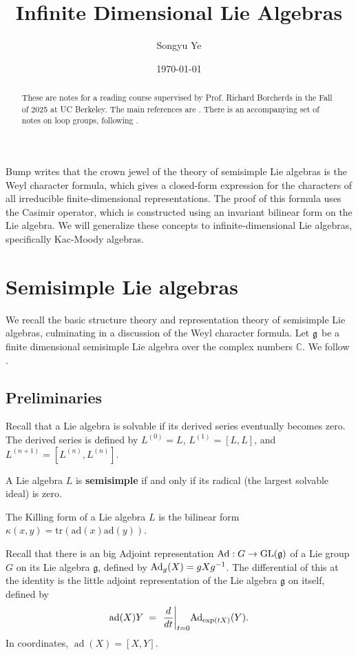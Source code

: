\documentclass[12pt]{article}
\begin{document}
\rhead{\today}
\cfoot{\thepage}

\title{Infinite Dimensional Lie Algebras}

\author{Songyu Ye}
\date{\today}
\maketitle


\begin{abstract}
    These are notes for a reading course supervised by Prof. Richard Borcherds in the Fall of 2025 at UC Berkeley. The main references are \cite{kac}. There is an accompanying set of notes on loop groups, following \cite{pressley-segal}.
\end{abstract}
\tableofcontents
Bump \cite{bump} writes that the crown jewel of the theory of semisimple Lie algebras is the Weyl character formula, which gives a closed-form expression for the characters of all irreducible finite-dimensional representations. The proof of this formula uses the Casimir operator, which is constructed using an invariant bilinear form on the Lie algebra. We will generalize these concepts to infinite-dimensional Lie algebras, specifically Kac-Moody algebras.
\section{Semisimple Lie algebras}
We recall the basic structure theory and representation theory of semisimple Lie algebras, culminating in a discussion of the Weyl character formula. Let $\mathfrak{g}$ be a finite dimensional semisimple Lie algebra over the complex numbers $\mathbb{C}$. We follow \cite{bump}.
\subsection{Preliminaries}
\begin{definition}
    Recall that a Lie algebra is solvable if its derived series eventually becomes zero. The derived series is defined by $L^{(0)} = L$, $L^{(1)} = [L,L]$, and $L^{(n+1)} = [L^{(n)}, L^{(n)}]$.
\end{definition}

\begin{definition}
    A Lie algebra $L$ is \textbf{semisimple} if and only if its radical (the largest solvable ideal) is zero.
\end{definition}

\begin{definition}
    The Killing form of a Lie algebra $L$ is the bilinear form $\kappa(x,y) = \text{tr}(\text{ad}(x)\text{ad}(y))$.
\end{definition}
Recall that there is an big Adjoint representation $\operatorname{Ad}: G \to \operatorname{GL}(\mathfrak{g})$ of a Lie group $G$ on its Lie algebra $\mathfrak{g}$, defined by $\operatorname{Ad}_g(X) = gXg^{-1}$. The differential of this at the identity is the little adjoint representation of the Lie algebra $\mathfrak{g}$ on itself, defined by
\begin{align*}
    \operatorname{ad}(X)Y \;=\; \left.\frac{d}{dt}\right|_{t=0}\!\operatorname{Ad}_{\exp(tX)}(Y).
\end{align*}
In coordinates, $\operatorname{ad}(X) = [X,Y]$.
\end{document}

